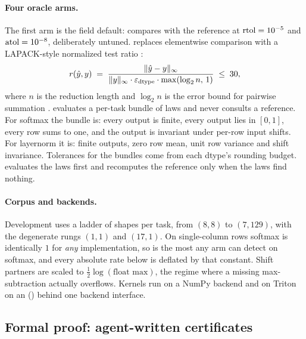 \paragraph{Four oracle arms.}
The first arm is the field default: \allclose compares with the reference at
$\mathrm{rtol}=10^{-5}$ and $\mathrm{atol}=10^{-8}$, deliberately
untuned. \RefArm replaces elementwise comparison with a LAPACK-style normalized test ratio
\citep{anderson1992lawn41}:
\begin{equation}
  r(\hat y, y) \;=\; \frac{\lVert \hat y - y \rVert_\infty}
       {\lVert y \rVert_\infty \cdot \varepsilon_{\text{dtype}} \cdot \max(\log_2 n,\, 1)}
  \;\le\; 30,
  \label{eq:ratio}
\end{equation}
where $n$ is the reduction length and $\log_2 n$ is the error bound for pairwise
summation \citep{higham2002accuracy}. \DeclArm evaluates a per-task bundle of laws and never
consults a reference. For softmax the bundle is: every output is finite, every output
lies in $[0,1]$, every row sums to one, and the output is invariant under per-row input
shifts. For layernorm it is: finite outputs, zero row mean, unit row variance and shift
invariance. Tolerances for the bundles come from each dtype's rounding budget. \HybArm
evaluates the laws first and recomputes the reference only when the laws find nothing.

\paragraph{Corpus and backends.}
Development uses a ladder of \ladderGroups{} shapes per task, from $(8,8)$ to $(7,129)$,
with the degenerate rungs $(1,1)$ and $(17,1)$. On single-column rows softmax is
identically $1$ for \emph{any} implementation, so \ladderCeiling{} is the most any arm
can detect on softmax, and every absolute rate below is deflated by that constant. Shift
partners are scaled to $\tfrac12\log(\text{float max})$, the regime where a missing
max-subtraction actually overflows. Kernels run on a NumPy backend and on Triton
\tritonVersion{} on an \gpuName{} (\gpuArch) behind one backend interface.

\subsection{Formal proof: agent-written certificates}
\label{sec:formal}

